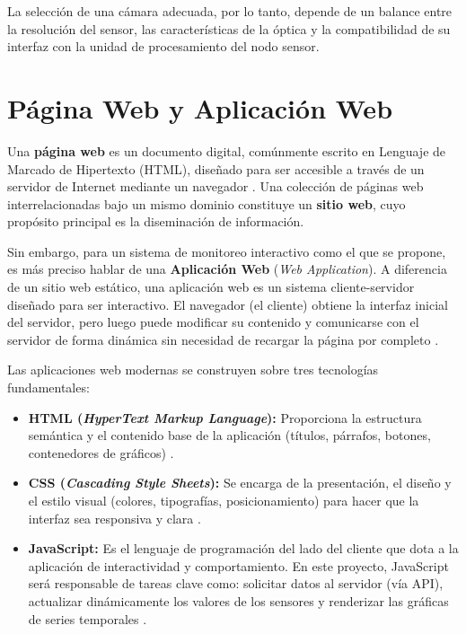 La selección de una cámara adecuada, por lo tanto, depende de un balance entre la resolución del sensor, las características de la óptica y la compatibilidad de su interfaz con la unidad de procesamiento del nodo sensor.

\section{Página Web y Aplicación Web}
\label{sec:pagina_web}

Una \textbf{página web} es un documento digital, comúnmente escrito en Lenguaje de Marcado de Hipertexto (HTML), diseñado para ser accesible a través de un servidor de Internet mediante un navegador \cite{niebla2013creación}. Una colección de páginas web interrelacionadas bajo un mismo dominio constituye un \textbf{sitio web}, cuyo propósito principal es la diseminación de información.

Sin embargo, para un sistema de monitoreo interactivo como el que se propone, es más preciso hablar de una \textbf{Aplicación Web} (\textit{Web Application}). A diferencia de un sitio web estático, una aplicación web es un sistema cliente-servidor diseñado para ser interactivo. El navegador (el cliente) obtiene la interfaz inicial del servidor, pero luego puede modificar su contenido y comunicarse con el servidor de forma dinámica sin necesidad de recargar la página por completo \cite{lujan2011programacion, mdn2024web}.

Las aplicaciones web modernas se construyen sobre tres tecnologías fundamentales:

\begin{itemize}
    \item \textbf{HTML (\textit{HyperText Markup Language}):} Proporciona la estructura semántica y el contenido base de la aplicación (títulos, párrafos, botones, contenedores de gráficos) \cite{mdn2024html}.
    \item \textbf{CSS (\textit{Cascading Style Sheets}):} Se encarga de la presentación, el diseño y el estilo visual (colores, tipografías, posicionamiento) para hacer que la interfaz sea responsiva y clara \cite{mdn2024css}.
    \item \textbf{JavaScript:} Es el lenguaje de programación del lado del cliente que dota a la aplicación de interactividad y comportamiento. En este proyecto, JavaScript será responsable de tareas clave como: solicitar datos al servidor (vía API), actualizar dinámicamente los valores de los sensores y renderizar las gráficas de series temporales \cite{mdn2024javascript}.
\end{itemize}

